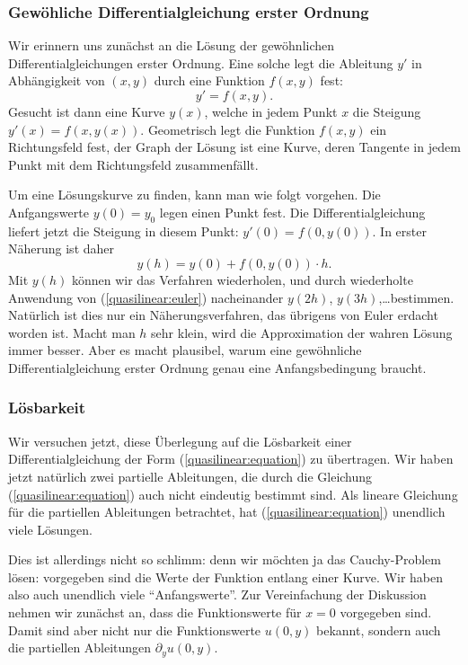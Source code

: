 \subsubsection{Gewöhliche Differentialgleichung erster Ordnung}
Wir erinnern uns zunächst an die Lösung der gewöhnlichen
Differentialgleichungen erster Ordnung.
Eine solche legt die Ableitung $y'$ in Abhängigkeit von 
$(x,y)$ durch eine Funktion $f(x,y)$ fest: 
\[
y'=f(x,y).
\]
Gesucht ist dann eine Kurve $y(x)$, welche
in jedem Punkt $x$ die Steigung $y'(x)=f(x,y(x))$.
Geometrisch legt die Funktion $f(x,y)$ ein Richtungsfeld fest,
der Graph der Lösung ist eine Kurve, deren Tangente in jedem
Punkt mit dem Richtungsfeld zusammenfällt.

Um eine Lösungskurve zu finden, kann man wie folgt vorgehen.
Die Anfgangswerte  $y(0)=y_0$ legen einen Punkt fest.
Die Differentialgleichung liefert jetzt die Steigung in
diesem Punkt: $y'(0)=f(0,y(0))$.
In erster Näherung ist daher
\begin{equation}
y(h)=y(0)+f(0,y(0))\cdot h.
\label{quasilinear:euler}
\end{equation}
Mit $y(h)$ können wir das Verfahren wiederholen, und durch
wiederholte Anwendung von (\ref{quasilinear:euler})
nacheinander $y(2h)$, $y(3h)$,\dots bestimmen.
Natürlich ist dies nur ein Näherungsverfahren, das übrigens
von Euler erdacht worden ist. Macht man $h$ sehr klein, wird
die Approximation der wahren Lösung immer besser.
Aber es macht plausibel, warum eine gewöhnliche Differentialgleichung
erster Ordnung genau eine Anfangsbedingung braucht.

\subsubsection{Lösbarkeit}
Wir versuchen jetzt, diese Überlegung auf die Lösbarkeit einer
Differentialgleichung der Form (\ref{quasilinear:equation}) zu 
übertragen.
Wir haben jetzt natürlich zwei partielle Ableitungen, die
durch die Gleichung (\ref{quasilinear:equation}) auch nicht
eindeutig bestimmt sind.
Als lineare Gleichung für die partiellen
Ableitungen betrachtet, hat (\ref{quasilinear:equation}) unendlich 
viele Lösungen.

Dies ist allerdings nicht so schlimm: denn wir möchten ja das Cauchy-Problem
lösen: vorgegeben sind die Werte der Funktion entlang einer Kurve.
Wir haben also auch unendlich viele ``Anfangswerte''.
Zur Vereinfachung der Diskussion nehmen wir zunächst an, dass die
Funktionswerte für $x=0$ vorgegeben sind.
Damit sind aber nicht nur die Funktionswerte $u(0,y)$ bekannt, sondern
auch die partiellen Ableitungen $\partial_yu(0,y)$.

